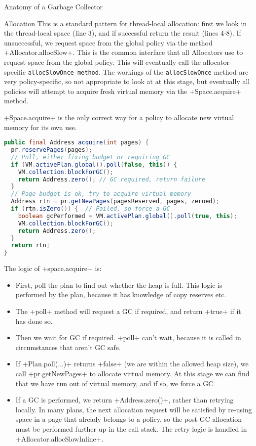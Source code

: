 \begin{section}{Anatomy of a Garbage Collector}
\begin{subsection}{Allocation}
This is a standard pattern for thread-local allocation: first we look in the thread-local space (line 3), and if successful return the result (lines 4-8).  If unsuccessful, we request space from the global policy via the method \spverb+Allocator.allocSlow+.  This is the common interface that all Allocators use to request space from the global policy.  This will eventually call the allocator-specific \texttt{allocSlowOnce method}.  The workings of the \texttt{allocSlowOnce} method are very policy-specific, so not appropriate to look at at this stage, but eventually all policies will attempt to acquire fresh virtual memory via the \spverb+Space.acquire+ method.

\spverb+Space.acquire+ is the only correct way for a policy to allocate new virtual memory for its own use.  


\begin{lstlisting}[language=Java,title=Space.java (simplified)]
public final Address acquire(int pages) {
  pr.reservePages(pages);
  // Poll, either fixing budget or requiring GC
  if (VM.activePlan.global().poll(false, this)) {
    VM.collection.blockForGC();
    return Address.zero(); // GC required, return failure
  }
  // Page budget is ok, try to acquire virtual memory
  Address rtn = pr.getNewPages(pagesReserved, pages, zeroed);
  if (rtn.isZero()) {  // Failed, so force a GC
    boolean gcPerformed = VM.activePlan.global().poll(true, this);
    VM.collection.blockForGC();
    return Address.zero();
  }
  return rtn;
}
\end{lstlisting}

The logic of \spverb+space.acquire+ is:
\begin{itemize}
  \item First, poll the plan to find out whether the heap is full.  This logic is performed by the plan, because it has knowledge of copy reserves etc.
  \item The \spverb+poll+ method will request a GC if required, and return \spverb+true+ if it has done so.
  \item Then we wait for GC if required. \spverb+poll+ can't wait, because it is called in circumstances that aren't GC safe.
  \item If \spverb+Plan.poll(...)+ returns \spverb+false+ (we are within the allowed heap size), we call \spverb+pr.getNewPages+ to allocate virtual memory.  At this stage we can find that we have run out of virtual memory, and if so, we force a GC
  \item If a GC is performed, we return \spverb+Address.zero()+, rather than retrying locally.  In many plans, the next allocation request will be satisfied by re-using space in a page that already belongs to a policy, so the post-GC allocation must be performed further up in the call stack. The retry logic is handled in \spverb+Allocator.allocSlowInline+.
\end{itemize}


\end{subsection}
\end{section}
